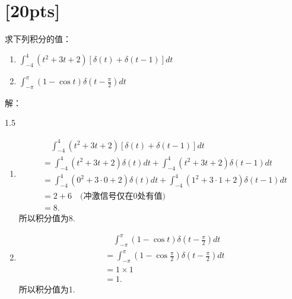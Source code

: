 \documentclass[a4paper,UTF8]{article}
\numberwithin{equation}{section}
\begin{document}
\begin{framed}
\begin{enumerate}[(1)]
        \end{enumerate}
\end{framed}





\newpage
\section{[20pts]}
求下列积分的值：
\begin{enumerate}[(1)]
    \item $\int_{-4}^{4} (t^{2} + 3t + 2)[\delta(t)+\delta(t-1)]dt$
    \item $\int_{-\pi}^{\pi} (1-) \delta(t-)dt$
\end{enumerate}

\begin{framed}
	解：
    \begin{spacing}{1.5}
        \begin{enumerate}[(1)]
            \item 
            \begin{align*}
            	&\quad\int_{-4}^{4} (t^{2} + 3t + 2)[\delta(t)+\delta(t-1)]dt\\
            	&= \int_{-4}^{4} (t^{2} + 3t + 2)\delta(t)dt + \int_{-4}^{4} (t^{2} + 3t + 2)\delta(t-1)dt\\
            	&= \int_{-4}^{4} (0^{2} + 3\cdot0 + 2)\delta(t)dt + \int_{-4}^{4} (1^{2} + 3\cdot1 + 2)\delta(t-1)dt\\
            	&= 2 + 6 \quad\text{(冲激信号仅在0处有值)} \\
            	&= 8.
            \end{align*}
            所以积分值为8.
            \item 
            \begin{align*}
            	&\quad\int_{-\pi}^{\pi} (1-\cos{t}) \delta(t-\frac{\pi}{2})dt\\
            	&= \int_{-\pi}^{\pi} (1-\cos{\frac{\pi}{2}}) \delta(t-\frac{\pi}{2})dt\\
            	&= 1\times1\\
            	&= 1.
            \end{align*}
            所以积分值为1.
        \end{enumerate}
    \end{spacing}
\end{framed}
\newpage
\end{document}
